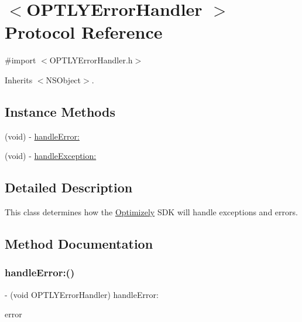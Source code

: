 \hypertarget{protocol_o_p_t_l_y_error_handler_01-p}{}\section{$<$O\+P\+T\+L\+Y\+Error\+Handler $>$ Protocol Reference}
\label{protocol_o_p_t_l_y_error_handler_01-p}


{\ttfamily \#import $<$O\+P\+T\+L\+Y\+Error\+Handler.\+h$>$}



Inherits $<$\+N\+S\+Object$>$.

\subsection*{Instance Methods}
\begin{DoxyCompactItemize}
\item 
(void) -\/ \mbox{\hyperlink{protocol_o_p_t_l_y_error_handler_01-p_a346526856c1f8c58aab0143b77d5a226}{handle\+Error\+:}}
\item 
(void) -\/ \mbox{\hyperlink{protocol_o_p_t_l_y_error_handler_01-p_a3540e8a0461cc0d9d3b117ca3febda23}{handle\+Exception\+:}}
\end{DoxyCompactItemize}


\subsection{Detailed Description}
This class determines how the \mbox{\hyperlink{interface_optimizely}{Optimizely}} S\+DK will handle exceptions and errors. 

\subsection{Method Documentation}
\mbox{\label{protocol_o_p_t_l_y_error_handler_01-p_a346526856c1f8c58aab0143b77d5a226}} 
\subsubsection{\texorpdfstring{handle\+Error\+:()}{handleError:()}}
{\footnotesize\ttfamily -\/ (void O\+P\+T\+L\+Y\+Error\+Handler) handle\+Error\+: \begin{DoxyParamCaption}\item[{(N\+S\+Error $\ast$)}]{error }\end{DoxyParamCaption}}

